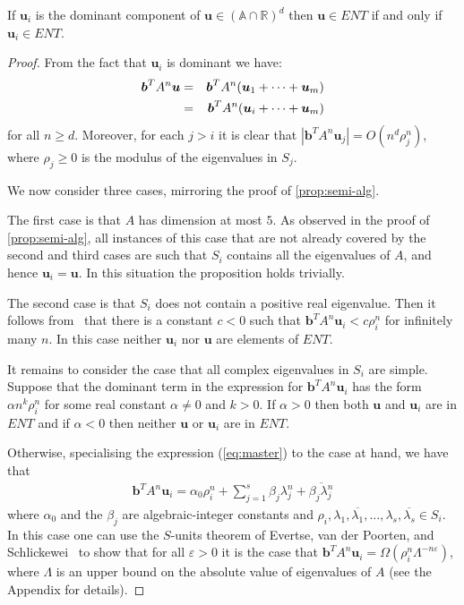 \begin{proposition}
  If $\boldsymbol{u}_i$ is the dominant component of $\boldsymbol{u}
  \in (\mathbb{A}\cap\mathbb{R})^d$ then $\boldsymbol{u}\in\mathit{ENT}$ if and only
if $\boldsymbol{u}_i \in \mathit{ENT}$.
\label{prop:dominant}
\end{proposition}
\begin{proof}
From the fact that $\boldsymbol{u}_i$ is dominant we have:
\begin{eqnarray}
 \boldsymbol{b}^TA^n\boldsymbol{u}&=&
   \boldsymbol{b}^TA^n(\boldsymbol{u}_1+\cdots+\boldsymbol{u}_m) \notag\\
&=&\boldsymbol{b}^TA^n(\boldsymbol{u}_i+\cdots+\boldsymbol{u}_m)
\label{eq:part}
\end{eqnarray}
for all $n\geq d$.  Moreover, for each $j>i$ it is clear that
  $|\boldsymbol{b}^TA^n\boldsymbol{u}_j| = O(n^d\rho_j^n)$, where
  $\rho_j\geq 0$ is the modulus of the eigenvalues in $S_j$.

  We now consider three cases, mirroring the proof of
  \cref{prop:semi-alg}.

  The first case is that $A$ has dimension at most $5$.  As observed
  in the proof of \cref{prop:semi-alg}, all instances of
  this case that are not already covered by the second and third cases
  are such that $S_i$ contains all the eigenvalues of $A$, and hence
  $\boldsymbol{u}_i=\boldsymbol{u}$.  In this situation the proposition
  holds trivially.

  The second case is that $S_i$ does not contain a positive real
  eigenvalue.  Then it follows from~\cite[Lemma 4]{Bra06} that there
  is a constant $c<0$ such that
  $\boldsymbol{b}^TA^n\boldsymbol{u}_i<c\rho_i^n$ for infinitely many
  $n$.  In this case neither $\boldsymbol{u}_i$ nor $\boldsymbol{u}$
  are elements of $\mathit{ENT}$.

  It remains to consider the case that all complex eigenvalues in
  $S_i$ are simple.  Suppose that the dominant term in the expression
  for $\boldsymbol{b}^TA^n\boldsymbol{u}_i$ has the form $\alpha
  n^k\rho_i^n$ for some real constant $\alpha\neq 0$ and $k>0$.  If
  $\alpha>0$ then both $\boldsymbol{u}$ and $\boldsymbol{u}_i$ are in
  $\mathit{ENT}$ and if $\alpha<0$ then neither $\boldsymbol{u}$ or
  $\boldsymbol{u}_i$ are in $\mathit{ENT}$.

  Otherwise, specialising the expression (\ref{eq:master}) to the case
  at hand, we have that
\begin{gather}
\label{eq:diag}
 \boldsymbol{b}^TA^n\boldsymbol{u}_i = \alpha_0 \rho_i^n+\sum\limits_{j=1}^s\beta_j\lambda_j^n+\overline{\beta_j\lambda_j^n}
\end{gather}
where $\alpha_0$ and the $\beta_j$ are algebraic-integer constants and
$\rho_i,\lambda_1,\overline{\lambda_1},\ldots,\lambda_s,\overline{\lambda_s} \in S_i$.  In this case one can use the
$S$-units theorem of Evertse, van der Poorten, and
Schlickewei~\cite{Evertse84,PS82} to show that for all $\varepsilon>0$ it
is the case that $\boldsymbol{b}^TA^n\boldsymbol{u}_i =\Omega\left(
  \rho_i^n \Lambda^{-n\varepsilon} \right)$,
where $\Lambda$ is an upper bound on the absolute value of eigenvalues of $A$ (see the Appendix for details).


\end{proof}

